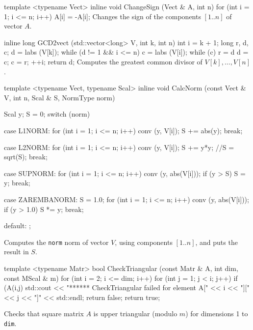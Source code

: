 {template <typename Vect>
inline void ChangeSign (Vect & A, int n)\hide
{
    for (int i = 1; i <= n; i++) A[i] = -A[i];
}
\endhide
\endcode
\tab
Changes the sign of the components $[1..n]$ of vector $A$.
\endtab
\code


inline long GCD2vect (std::vector<long> V, int k, int n)\hide
{
    int i = k + 1;
    long r, d, c;
    d = labs (V[k]);
    while (d != 1 && i <= n) {
        c = labs (V[i]);
        while (c) {
            r = d %
            d = c;
            c = r;
        }
        ++i;
    }
        return d;
}
\endhide
\endcode
\tab
Computes the greatest common divisor of $V[k],\ldots,V[n]$.
\endtab
\code


template <typename Vect, typename Scal>
inline void CalcNorm (const Vect & V, int n, Scal & S, NormType norm)\hide
{
    Scal y;
    S = 0;
    switch (norm) {
        case L1NORM:
            for (int i = 1; i <= n; i++) {
                conv (y, V[i]);
                S += abs(y);
            }
            break;

        case L2NORM:
            for (int i = 1; i <= n; i++) {
                conv (y, V[i]);
                S += y*y;
            }
            //S = sqrt(S);
            break;

        case SUPNORM:
            for (int i = 1; i <= n; i++) {
                conv (y, abs(V[i]));
                if (y > S)
                    S = y;
            }
            break;

        case ZAREMBANORM:
            S = 1.0;
            for (int i = 1; i <= n; i++) {
                conv (y, abs(V[i]));
                if (y > 1.0)
                   S *= y;
            }
            break;

        default:
            ;
    }
}
\endhide
\endcode
\tab
Computes the \texttt{norm} norm of vector $V$, using components $[1..n]$,
   and puts the result in $S$.
\endtab


\code

template <typename Matr>
bool CheckTriangular (const Matr & A, int dim, const MScal & m) \hide
{
   for (int i = 2; i <= dim; i++) {
      for (int j = 1; j < i; j++) {
         if (A(i,j) %
            std::cout << "******  CheckTriangular failed for element A[" << i <<
                 "][" << j << "]" << std::endl;
            return false;
         }
      }
    }
    return true;
}\endhide
\endcode
\tab
 Checks that square matrix $A$ is upper triangular (modulo $m$) for
dimensions 1 to \texttt{dim}.
\endtab
\code


